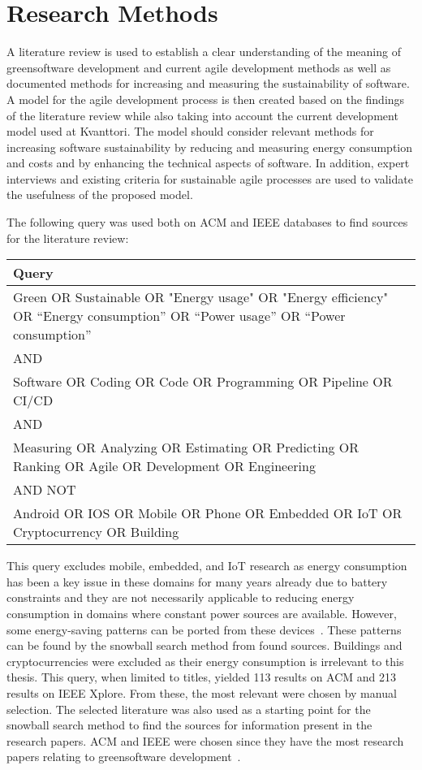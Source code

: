 \section{Research Methods}
A literature review is used to establish a clear understanding of the meaning of \gls{greensoftware} development and current agile development methods as well as documented methods for increasing and measuring the sustainability of software. A model for the agile development process is then created based on the findings of the literature review while also taking into account the current development model used at Kvanttori. The model should consider relevant methods for increasing software sustainability by reducing and measuring energy consumption and costs and by enhancing the technical aspects of software. In addition, expert interviews and existing criteria for sustainable agile processes are used to validate the usefulness of the proposed model.

The following query was used both on ACM and IEEE databases to find sources for the literature review: 

\begin{center}
\begin{tabular}{ |>{\centering\arraybackslash}m{\textwidth}| } 
\hline
\textbf{Query}\\
\hline
Green OR Sustainable  OR "Energy usage" OR "Energy efficiency" OR “Energy consumption” OR “Power usage” OR “Power consumption”\\
\hline
AND\\
\hline
Software OR Coding OR Code OR Programming OR Pipeline OR CI/CD\\
\hline
 AND\\
\hline
Measuring OR Analyzing OR Estimating OR Predicting OR Ranking OR Agile OR Development OR Engineering\\
\hline
AND NOT\\
\hline
Android OR IOS OR Mobile OR Phone OR Embedded OR IoT OR Cryptocurrency OR Building\\
\hline
\end{tabular}
\end{center}

This query excludes mobile, embedded, and IoT research as energy consumption has been a key issue in these domains for many years already due to battery constraints and they are not necessarily applicable to reducing energy consumption in domains where constant power sources are available. However, some energy-saving patterns can be ported from these devices~\cite{energypatternsforweb}. These patterns can be found by the snowball search method from found sources. Buildings and cryptocurrencies were excluded as their energy consumption is irrelevant to this thesis. This query, when limited to titles, yielded 113 results on ACM and 213 results on IEEE Xplore. From these, the most relevant were chosen by manual selection. The selected literature was also used as a starting point for the snowball search method to find the sources for information present in the research papers. ACM and IEEE were chosen since they have the most research papers relating to \gls{greensoftware} development~\cite{softwareengineerginaspectsofgreen}.

